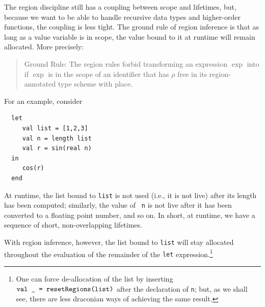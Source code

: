 \documentclass[12pt]{book}
\begin{document}
The region discipline still has a coupling between scope and
lifetimes, but, because we want to be able to handle recursive data
types and higher-order functions, the coupling is less tight.  The
ground rule of region inference
%
%
is that as long as a value variable is in scope, the value bound to it
at runtime will remain allocated. More precisely:
\begin{quote}
  Ground Rule: The region rules forbid transforming an expression
  $\exp$ into  if $\exp$ is in
  the scope of an identifier that has $\rho$ free in its
  region-annotated type scheme with place.
\end{quote}
For an example, consider
\begin{verbatim}
  let
     val list = [1,2,3]
     val n = length list
     val r = sin(real n)
  in
     cos(r)
  end
\end{verbatim} 
At runtime, the list bound to {\tt list} is not used (i.e., it is not
live) after its length has been computed; similarly, the value of {\tt
  n} is not live after it has been converted to a floating point
number, and so on. In short, at runtime, we have a sequence of short,
non-overlapping lifetimes.

With region inference, however, the list bound to {\tt list} will stay
allocated throughout the evaluation of the remainder of the {\tt let}
expression.\footnote{One can force de-allocation of the list by
  inserting $\hbox{\tt val \_ = \hbox{\tt resetRegions}(list)}$ after the declaration of
  {\tt n}; but, as we shall see, there are less draconian ways of
  achieving the same result.}
\end{document}
